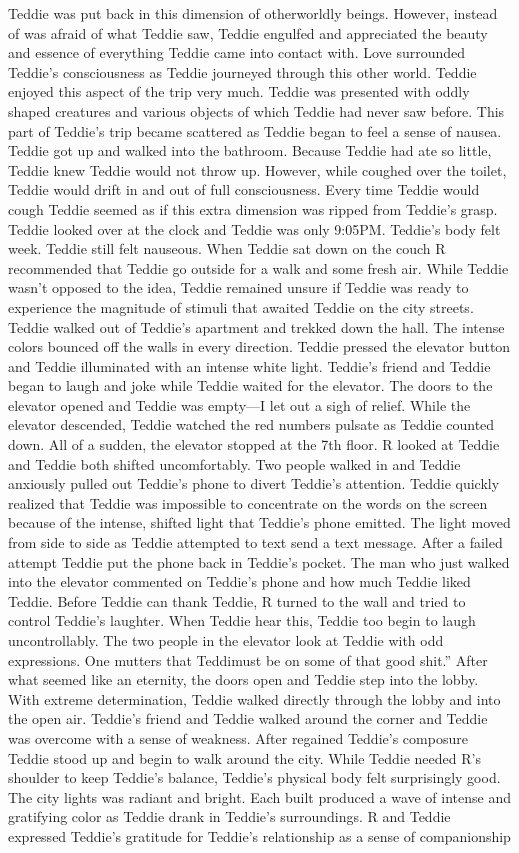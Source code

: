 \documentclass[12pt]{book}
\begin{document}
Teddie was put back in this dimension of otherworldly beings. However, instead of was afraid of what Teddie saw, Teddie engulfed and appreciated the beauty and essence of everything Teddie came into contact with. Love surrounded Teddie's consciousness as Teddie journeyed through this other world. Teddie enjoyed this aspect of the trip very much. Teddie was presented with oddly shaped creatures and various objects of which Teddie had never saw before. This part of Teddie's trip became scattered as Teddie began to feel a sense of nausea. Teddie got up and walked into the bathroom. Because Teddie had ate so little, Teddie knew Teddie would not throw up. However, while coughed over the toilet, Teddie would drift in and out of full consciousness. Every time Teddie would cough Teddie seemed as if this extra dimension was ripped from Teddie's grasp. Teddie looked over at the clock and Teddie was only 9:05PM. Teddie's body felt week. Teddie still felt nauseous. When Teddie sat down on the couch R recommended that Teddie go outside for a walk and some fresh air. While Teddie wasn't opposed to the idea, Teddie remained unsure if Teddie was ready to experience the magnitude of stimuli that awaited Teddie on the city streets. Teddie walked out of Teddie's apartment and trekked down the hall. The intense colors bounced off the walls in every direction. Teddie pressed the elevator button and Teddie illuminated with an intense white light. Teddie's friend and Teddie began to laugh and joke while Teddie waited for the elevator. The doors to the elevator opened and Teddie was empty---I let out a sigh of relief. While the elevator descended, Teddie watched the red numbers pulsate as Teddie counted down. All of a sudden, the elevator stopped at the 7th floor. R looked at Teddie and Teddie both shifted uncomfortably. Two people walked in and Teddie anxiously pulled out Teddie's phone to divert Teddie's attention. Teddie quickly realized that Teddie was impossible to concentrate on the words on the screen because of the intense, shifted light that Teddie's phone emitted. The light moved from side to side as Teddie attempted to text send a text message. After a failed attempt Teddie put the phone back in Teddie's pocket. The man who just walked into the elevator commented on Teddie's phone and how much Teddie liked Teddie. Before Teddie can thank Teddie, R turned to the wall and tried to control Teddie's laughter. When Teddie hear this, Teddie too begin to laugh uncontrollably. The two people in the elevator look at Teddie with odd expressions. One mutters that Teddimust be on some of that good shit.'' After what seemed like an eternity, the doors open and Teddie step into the lobby. With extreme determination, Teddie walked directly through the lobby and into the open air. Teddie's friend and Teddie walked around the corner and Teddie was overcome with a sense of weakness. After regained Teddie's composure Teddie stood up and begin to walk around the city. While Teddie needed R's shoulder to keep Teddie's balance, Teddie's physical body felt surprisingly good. The city lights was radiant and bright. Each built produced a wave of intense and gratifying color as Teddie drank in Teddie's surroundings. R and Teddie expressed Teddie's gratitude for Teddie's relationship as a sense of companionship 
\end{document}
